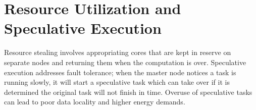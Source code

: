 

\section{Resource Utilization and Speculative Execution}

Resource stealing involves appropriating cores that are kept in reserve
on separate nodes and returning them when the computation is over.
Speculative execution addresses fault tolerance; when the master node
notices a task is running slowly, it will start a speculative task which
can take over if it is determined the original task will not finish in
time. Overuse of speculative tasks can lead to poor data locality and
higher energy demands.



